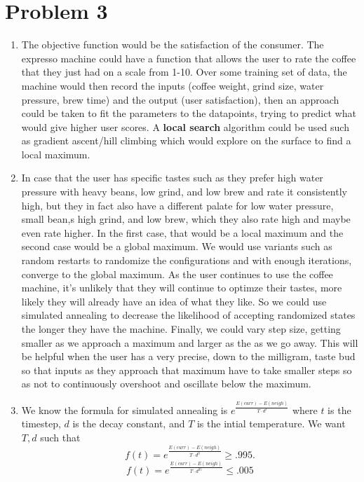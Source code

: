 \documentclass[a4paper]{article}
\begin{document}
\section{Problem 3}
\begin{enumerate}
  \item The objective function would be the satisfaction of the consumer. The expresso machine could have a
    function that allows the user to rate the coffee that they just had on a scale from 1-10. Over some training
    set of data, the machine would then record the inputs (coffee weight, grind size, water pressure, brew time) 
    and the output (user satisfaction), then an approach could be taken to fit the parameters to the datapoints,
    trying to predict what would give higher user scores. A \textbf{local search} algorithm could be used
    such as gradient ascent/hill climbing which would explore on the surface to find a local maximum. 
  \item In case that the user has specific tastes such as they prefer high water pressure with heavy beans, low grind,
    and low brew and rate it consistently high, but they in fact also have a different palate for low water pressure,
    small bean,s high grind, and low brew, which they also rate high and maybe even rate higher. In the first case,
    that would be a local maximum and the second case would be a global maximum. We would use variants such as 
    random restarts to randomize the configurations and with enough iterations, converge to the global maximum. As
    the user continues to use the coffee machine, it's unlikely that they will continue to optimze their tastes,
    more likely they will already have an idea of what they like. So we could use simulated annealing to decrease
    the likelihood of accepting randomized states the longer they have the machine. Finally, we could vary step
    size, getting smaller as we approach a maximum and larger as the as we go away. This will be helpful when
    the user has a very precise, down to the milligram, taste bud so that inputs as they approach that maximum
    have to take smaller steps so as not to continuously overshoot and oscillate below the maximum.
  \item We know the formula for simulated annealing is $e^{\frac{E(curr) - E(neigh)}{T \cdot d^t}}$ where $t$ is the 
    timestep,  $d$ is the decay constant, and  $T$ is the intial temperature.  We want $T,d$ such that
    \[
    f(t) = e^{\frac{E(curr) - E(neigh)}{T \cdot d^0}} \geq .995 
    .\] 
    \[
      f(t) = e^{\frac{E(curr) - E(neigh)}{T \cdot d^{35}}} \leq .005 
\]
\end{enumerate}
\end{document}
